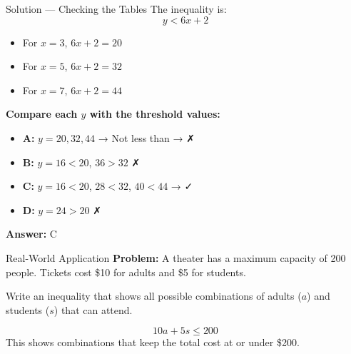 \documentclass{beamer}
\begin{document}
\begin{frame}{Solution — Checking the Tables}
    \small
    The inequality is:
    \[
    y < 6x + 2
    \]

    \begin{itemize}
        \item For $x = 3$, $6x + 2 = 20$
        \item For $x = 5$, $6x + 2 = 32$
        \item For $x = 7$, $6x + 2 = 44$
    \end{itemize}

    \textbf{Compare each $y$ with the threshold values:}

    \begin{itemize}
        \item \textbf{A:} $y = 20, 32, 44$ → Not less than → ✗
        \item \textbf{B:} $y = 16 < 20$, $36 > 32$ ✗
        \item \textbf{C:} $y = 16 < 20$, $28 < 32$, $40 < 44$ → ✓
        \item \textbf{D:} $y = 24 > 20$ ✗
    \end{itemize}

    \textbf{Answer:} $\boxed{\text{C}}$
\end{frame}

\begin{frame}
\end{frame}

\begin{frame}{Real-World Application}
    \textbf{Problem:} A theater has a maximum capacity of 200 people. Tickets cost \$10 for adults and \$5 for students.

    Write an inequality that shows all possible combinations of adults ($a$) and students ($s$) that can attend.

    \[
    10a + 5s \le 200
    \]
    \vspace{0.3cm}
    This shows combinations that keep the total cost at or under \$200.
\end{frame}
\end{document}
